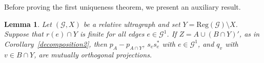 \documentclass[12pt, reqno]{amsart}
\newtheorem{lemma}[theorem]{Lemma}
\theoremstyle{definition}
\theoremstyle{remark}
\numberwithin{equation}{section}
\newcommand{\G}{\mathcal{G}}
\begin{document}




Before proving the first uniqueness theorem, we present an auxiliary result.

\begin{lemma}\label{Aux2condL}
Let $(\G,X)$ be a relative ultragraph and set $Y=\mathrm{Reg}(\G)\setminus X$. Suppose that
$r(e)\cap Y$ is finite for all edges $e \in \G^1$. If $Z=A \cup (B \cap Y)'$, as in
Corollary~\ref{decomposition2}, then $p_A - p_{A \cap Y}$, $s_e s_e^*$ with $e \in \G^1$, and
$q_v$ with $v \in B \cap Y$, are mutually orthogonal projections.
\end{lemma}
\end{document}
